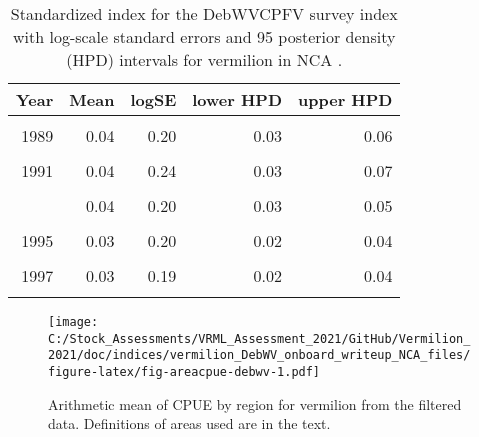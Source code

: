 \documentclass[11pt,
  english,
  a4paper,
]{article}
\begin{document}
\begin{table}

\caption{\label{tab:tab-index-debwv}Standardized index for the DebWVCPFV survey index with log-scale standard errors and 95%
       posterior density (HPD) intervals for vermilion in NCA .}
\centering
\begin{tabular}[t]{rrrrr}
\toprule
Year & Mean & logSE & lower HPD & upper HPD\\
\midrule
\cellcolor{gray!6}{1988} & \cellcolor{gray!6}{0.03} & \cellcolor{gray!6}{0.22} & \cellcolor{gray!6}{0.02} & \cellcolor{gray!6}{0.05}\\
1989 & 0.04 & 0.20 & 0.03 & 0.06\\
\cellcolor{gray!6}{1990} & \cellcolor{gray!6}{0.09} & \cellcolor{gray!6}{0.23} & \cellcolor{gray!6}{0.06} & \cellcolor{gray!6}{0.14}\\
1991 & 0.04 & 0.24 & 0.03 & 0.07\\
\cellcolor{gray!6}{1992} & \cellcolor{gray!6}{0.04} & \cellcolor{gray!6}{0.20} & \cellcolor{gray!6}{0.03} & \cellcolor{gray!6}{0.06}\\
\addlinespace
1993 & 0.04 & 0.20 & 0.03 & 0.05\\
\cellcolor{gray!6}{1994} & \cellcolor{gray!6}{0.03} & \cellcolor{gray!6}{0.20} & \cellcolor{gray!6}{0.02} & \cellcolor{gray!6}{0.05}\\
1995 & 0.03 & 0.20 & 0.02 & 0.04\\
\cellcolor{gray!6}{1996} & \cellcolor{gray!6}{0.02} & \cellcolor{gray!6}{0.21} & \cellcolor{gray!6}{0.01} & \cellcolor{gray!6}{0.03}\\
1997 & 0.03 & 0.19 & 0.02 & 0.04\\
\addlinespace
\cellcolor{gray!6}{1998} & \cellcolor{gray!6}{0.03} & \cellcolor{gray!6}{0.21} & \cellcolor{gray!6}{0.02} & \cellcolor{gray!6}{0.05}\\
\bottomrule
\end{tabular}
\end{table}

\FloatBarrier

\begin{figure}
\centering
\texttt{[image: C:/Stock\_Assessments/VRML\_Assessment\_2021/GitHub/Vermilion\_2021/doc/indices/vermilion\_DebWV\_onboard\_writeup\_NCA\_files/figure-latex/fig-areacpue-debwv-1.pdf]}
\caption{\label{fig:fig-areacpue-debwv}Arithmetic mean of CPUE by region for vermilion from the filtered data. Definitions of areas used are in the text.}
\end{figure}
\end{document}
